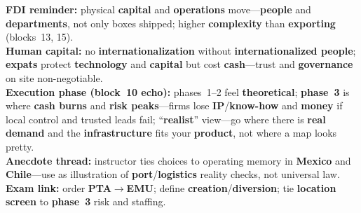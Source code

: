 \documentclass[10pt,a4paper]{article}
\begin{document}
{\textbf{FDI reminder:} physical \textbf{capital} and \textbf{operations} move---\textbf{people} and \textbf{departments}, not only boxes shipped; higher \textbf{complexity} than \textbf{exporting} (blocks~13, 15).\\
\textbf{Human capital:} no \textbf{internationalization} without \textbf{internationalized people}; \textbf{expats} protect \textbf{technology} and \textbf{capital} but cost \textbf{cash}---trust and \textbf{governance} on site non-negotiable.\\
\textbf{Execution phase (block~10 echo):} phases~1--2 feel \textbf{theoretical}; \textbf{phase~3} is where \textbf{cash burns} and \textbf{risk peaks}---firms lose \textbf{IP}/\textbf{know-how} and \textbf{money} if local control and trusted leads fail; ``\textbf{realist}'' view---go where there is \textbf{real demand} and the \textbf{infrastructure} fits your \textbf{product}, not where a map looks pretty.\\
\textbf{Anecdote thread:} instructor ties choices to operating memory in \textbf{Mexico} and \textbf{Chile}---use as illustration of \textbf{port}/\textbf{logistics} reality checks, not universal law.\\
\textbf{Exam link:} order \textbf{PTA}$\rightarrow$\textbf{EMU}; define \textbf{creation}/\textbf{diversion}; tie \textbf{location screen} to \textbf{phase~3} risk and staffing.
}
\end{document}
